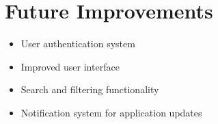 \documentclass{article}
\begin{document}
\section{Future Improvements}
\begin{itemize}
    \item User authentication system
    \item Improved user interface
    \item Search and filtering functionality
    \item Notification system for application updates
\end{itemize}
\end{document}
